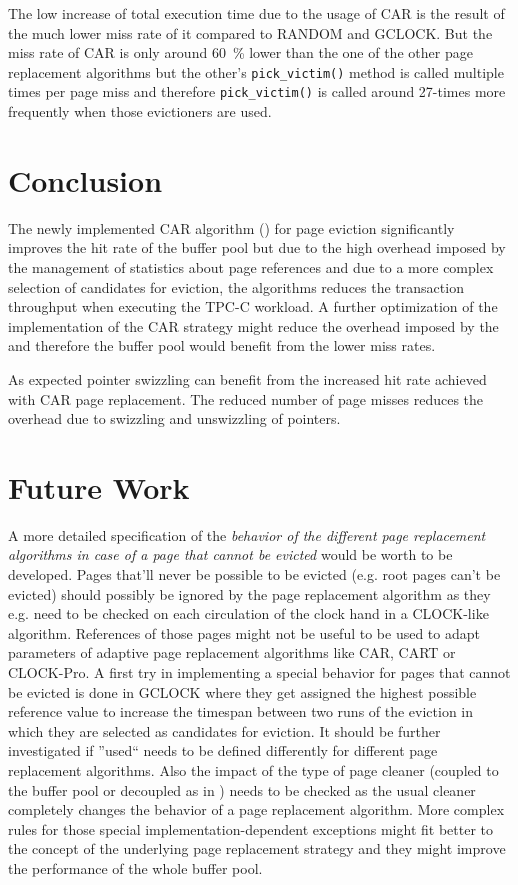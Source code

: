 	The low increase of total execution time due to the usage of CAR is the result of the much lower miss rate of it compared to RANDOM and GCLOCK. But the miss rate of CAR is only around \SI{60}{\percent} lower than the one of the other page replacement algorithms but the other's \lstinline{pick_victim()} method is called multiple times per page miss and therefore \lstinline{pick_victim()} is called around 27-times more frequently when those evictioners are used.
	
\section{Conclusion}

	The newly implemented CAR algorithm (\cite{Bansal:2004}) for page eviction significantly improves the hit rate of the buffer pool but due to the high overhead imposed by the management of statistics about page references and due to a more complex selection of candidates for eviction, the algorithms reduces the transaction throughput when executing the TPC-C workload. A further optimization of the implementation of the CAR strategy might reduce the overhead imposed by the and therefore the buffer pool would benefit from the lower miss rates.
	
	As expected pointer swizzling can benefit from the increased hit rate achieved with CAR page replacement. The reduced number of page misses reduces the overhead due to swizzling and unswizzling of pointers.

\section{Future Work}

	A more detailed specification of the \emph{behavior of the different page replacement algorithms in case of a page that cannot be evicted} would be worth to be developed. Pages that'll never be possible to be evicted (e.g. root pages can't be evicted) should possibly be ignored by the page replacement algorithm as they e.g. need to be checked on each circulation of the clock hand in a CLOCK-like algorithm. References of those pages might not be useful to be used to adapt parameters of adaptive page replacement algorithms like CAR, CART or CLOCK-Pro. A first try in implementing a special behavior for pages that cannot be evicted is done in GCLOCK where they get assigned the highest possible reference value to increase the timespan between two runs of the eviction in which they are selected as candidates for eviction. It should be further investigated if ''used`` needs to be defined differently for different page replacement algorithms. Also the impact of the type of page cleaner (coupled to the buffer pool or decoupled as in \cite{Sauer:2016}) needs to be checked as the usual cleaner completely changes the behavior of a page replacement algorithm. More complex rules for those special implementation-dependent exceptions might fit better to the concept of the underlying page replacement strategy and they might improve the performance of the whole buffer pool.
	
